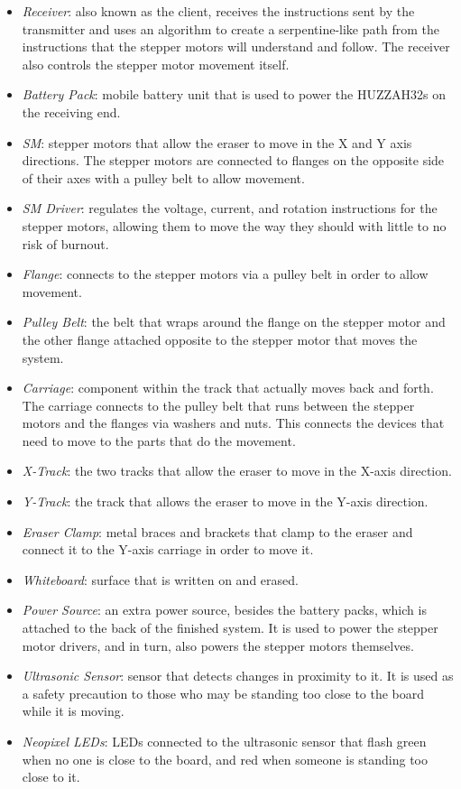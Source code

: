 \begin{itemize}
	\item \textit{Receiver}: also known as the client, receives the instructions sent by the transmitter and uses an algorithm to create a serpentine-like path from the instructions that the stepper motors will understand and follow. The receiver also controls the stepper motor movement itself.
	\item \textit{Battery Pack}: mobile battery unit that is used to power the HUZZAH32s on the receiving end.
	\item \textit{SM}: stepper motors that allow the eraser to move in the X and Y axis directions. The stepper motors are connected to flanges on the opposite side of their axes with a pulley belt to allow movement.
	\item \textit{SM Driver}: regulates the voltage, current, and rotation instructions for the stepper motors, allowing them to move the way they should with little to no risk of burnout.
	\item \textit{Flange}: connects to the stepper motors via a pulley belt in order to allow movement.
	\item \textit{Pulley Belt}: the belt that wraps around the flange on the stepper motor and the other flange attached opposite to the stepper motor that moves the system.
	\item \textit{Carriage}: component within the track that actually moves back and forth. The carriage connects to the pulley belt that runs between the stepper motors and the flanges via washers and nuts. This connects the devices that need to move to the parts that do the movement.
	\item \textit{X-Track}: the two tracks that allow the eraser to move in the X-axis direction.
	\item \textit{Y-Track}: the track that allows the eraser to move in the Y-axis direction.
	\item \textit{Eraser Clamp}: metal braces and brackets that clamp to the eraser and connect it to the Y-axis carriage in order to move it.
	\item \textit{Whiteboard}: surface that is written on and erased.
	\item \textit{Power Source}: an extra power source, besides the battery packs, which is attached to the back of the finished system. It is used to power the stepper motor drivers, and in turn, also powers the stepper motors themselves.
	\item \textit{Ultrasonic Sensor}: sensor that detects changes in proximity to it. It is used as a safety precaution to those who may be standing too close to the board while it is moving.
	\item \textit{Neopixel LEDs}: LEDs connected to the ultrasonic sensor that flash green when no one is close to the board, and red when someone is standing too close to it.
	 
\end{itemize} \par
